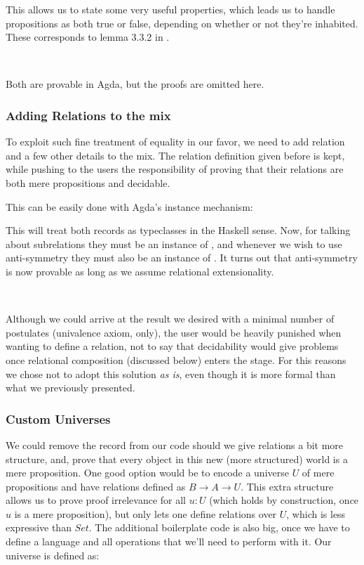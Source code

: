   
  This allows us to state some very useful properties, which leads us to handle propositions
  as both true or false, depending on whether or not they're inhabited. These corresponds to
  lemma 3.3.2 in \cite{hottbook}.
  
  \\
  
  Both are provable in Agda, but the proofs are omitted here.
  
  \subsubsection{Adding Relations to the mix}
  
  To exploit such fine treatment of equality in our favor, we need to add
  relation and a few other details to the mix. The relation definition
  given before is kept, while pushing to the users the responsibility of proving that their relations
  are both mere propositions and decidable.
  
  This can be easily done with Agda's instance mechanism:
  
  
  This will treat both records as typeclasses in the Haskell sense. Now, for talking about
  subrelations they must be an instance of , and whenever we wish to use anti-symmetry
  they must also be an instance of . It turns out that anti-symmetry is now
  provable as long as we assume relational extensionality.
  
  \\
  
  Although we could arrive at the result we desired with a minimal number of postulates (univalence axiom, only), 
  the user would be heavily punished when wanting to define a relation, not to
  say that decidability would give problems once relational composition (discussed below) enters the stage. For this reasons
  we chose not to adopt this solution \emph{as is}, even though it is more formal than what we previously
  presented.

\subsubsection{Custom Universes}


  We could remove the  record from our code should we give relations a bit more structure,
  and, prove that every object in this new (more structured) world is a mere proposition.
  One good option would be to encode a universe $U$ of mere propositions and have relations
  defined as $B \rightarrow A \rightarrow U$. This extra structure allows us to prove proof irrelevance
  for all $u : U$ (which holds by construction, once $u$ is a mere proposition), but only lets one define
  relations over $U$, which is less expressive than $Set$. The additional boilerplate code is also big,
  once we have to define a language and all operations that we'll need to perform with it. 
  Our universe is defined as:
  
